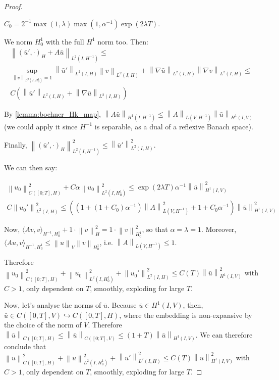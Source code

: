 \documentclass[english,a4paper,10pt,oneside]{scrbook}	%
\theoremstyle{break}
\newenvironment{mproof}[1][\proofname]{%
  \begin{proof}[#1]$ $\par\nobreak\ignorespaces
}{%
  \end{proof}
}
\renewcommand*{\proofname}{Proof}
\theoremstyle{remark}
\newcommand{\ds}{\displaystyle}
\newcommand{\norm}[1]{\left\lVert#1\right\rVert}
\newcommand{\HN}[1]{\norm{#1}_{H}}
\newcommand{\VN}[1]{\norm{#1}_{V}}
\newcommand{\emb}{\hookrightarrow}
\begin{document}
\begin{mproof}
$C_0 = \ds 2^{-1}\max(1,\lambda)\max(1,\alpha^{-1})\exp(2\lambda T)$.

We norm $H^1_0$ with the full $H^1$ norm too. Then:
\begin{align*}
\norm{(\bar{u}',\cdot)_H+ A \bar{u}}_{L^2(I,H^{-1})}\leq \\
\sup_{\norm{v}_{L^2(I,H^{1}_0)}=1}\norm{\bar{u}'}_{L^2(I,H)}\norm{v}_{L^2(I,H)}+\norm{\nabla \bar{u}}_{L^2(I,H)}\norm{\nabla v}_{L^2(I,H)}\leq \\C(\norm{\bar{u}'}_{L^2(I,H)}+\norm{\nabla \bar{u}}_{L^2(I,H)})
\end{align*}

By \cref{lemma:bochner_Hk_map}, $\norm{A \bar{u}}_{H^1(I, H^{-1})}\leq \norm{A}_{L(V,H^{-1})}\norm{\bar{u}}_{H^1(I,V)}$ (we could apply it since $H^{-1}$ is separable, as a dual of a reflexive Banach space).

Finally, $\norm{(\bar{u}',\cdot)_H}^2_{L^2(I,H^{-1})}\leq \norm{\bar{u}'}_{L^2(I,H)}^2$.

We can then say:

\begin{align*}
\norm{u_0}^2_{C([0;T],H)}+C\alpha\norm{u_0}_{L^2(I,H^1_0)}^2\leq \exp(2\lambda T)\alpha^{-1}\norm{\bar{u}}^2_{H^1(I,V)}\\
C\norm{u_0'}^2_{L^2(I,H)}\leq 
((1+(1+C_0)\alpha^{-1})\norm{A}_{L(V,H^{-1})}^2 +1 +C_0\alpha^{-1})\norm{\bar{u}}^2_{H^1(I,V)}
\end{align*}

Now, $\langle Av, v\rangle_{H^{-1}, H^1_0} + 1\cdot  \HN{v}^2 = 1\cdot \norm{v}_{H^1_0}^2$, so that $\alpha=\lambda=1$. Moreover, $\langle Au, v\rangle_{H^{-1}, H^1_0}\leq \VN{u}\norm{v}_{H^1_0}$, i.e. $\norm{A}_{L(V,H^{-1})}\leq 1$.

Therefore $\norm{u_0}^2_{C([0;T],H)}+\norm{u_0}_{L^2(I,H^1_0)}^2 + \norm{u_0'}^2_{L^2(I,H)}\leq C(T)\norm{\bar{u}}_{H^1(I,V)}^2$ with $C>1$, only dependent on $T$, smoothly, exploding for large $T$.

Now, let's analyse the norms of $\bar{u}$. Because $\bar{u}\in H^1(I,V)$, then, $\bar{u} \in C([0,T],V)\emb C([0,T],H)$, where the embedding is non-expansive by the choice of the norm of $V$. Therefore $\norm{\bar{u}}_{C([0;T],H)}\leq \norm{\bar{u}}_{C([0;T],V)}\leq (1+T)\norm{\bar{u}}_{H^1(I,V)}$. We can therefore conclude that $\norm{u}^2_{C([0;T],H)}+\norm{u}_{L^2(I,H^1_0)}^2 + \norm{u'}^2_{L^2(I,H)}\leq C(T)\norm{\bar{u}}_{H^1(I,V)}^2$ with $C>1$, only dependent on $T$, smoothly, exploding for large $T$.

\end{mproof}
\end{document}
